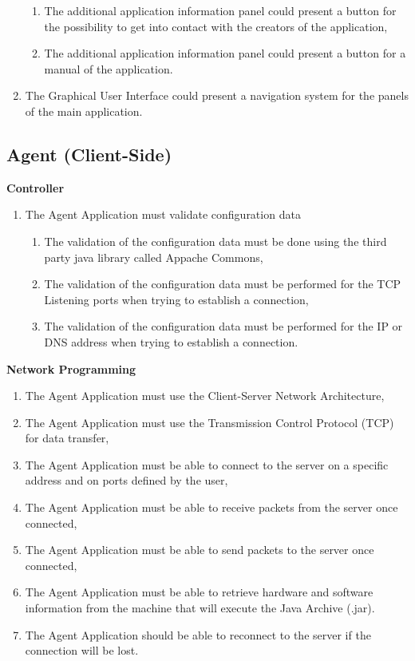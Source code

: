 \begin{enumerate}
\begin{enumerate}
        \item The additional application information panel could present a button for the possibility to get into
        contact with the creators of the application,
        \item The additional application information panel could present a button for a manual of the application.
    \end{enumerate}
    \item The Graphical User Interface could present a navigation system for the panels of the main application.
\end{enumerate}

\newpage

\subsection{Agent (Client-Side)}

\noindent
\textbf{Controller}

\begin{enumerate}
    \item The Agent Application must validate configuration data
    \begin{enumerate}
        \item The validation of the configuration data must be done using the third party java library
              called Appache Commons,
        \item The validation of the configuration data must be performed for the TCP Listening ports when
              trying to establish a connection,
        \item The validation of the configuration data must be performed for the IP or DNS address when
              trying to establish a connection.
    \end{enumerate}
\end{enumerate}

\noindent
\textbf{Network Programming}

\begin{enumerate}
    \item The Agent Application must use the Client-Server Network Architecture,
    \item The Agent Application must use the Transmission Control Protocol (TCP) for data transfer,
    \item The Agent Application must be able to connect to the server on a specific address and
          on ports defined by the user,
    \item The Agent Application must be able to receive packets from the server once connected,
    \item The Agent Application must be able to send packets to the server once connected,
    \item The Agent Application must be able to retrieve hardware and software information from the machine
          that will execute the Java Archive (.jar).
    \item The Agent Application should be able to reconnect to the server if the connection will be lost.
\end{enumerate}

